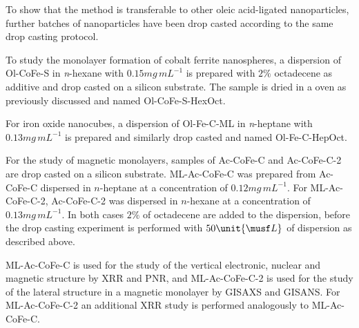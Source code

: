 \documentclass[\main/dresen_thesis.tex]{subfiles}
\begin{document}
      To show that the method is transferable to other oleic acid-ligated nanoparticles, further batches of nanoparticles have been drop casted according to the same drop casting protocol.

      To study the monolayer formation of cobalt ferrite nanospheres, a dispersion of Ol-CoFe-S in \textit{n}-hexane with $0.15 \unit{mg \, mL^{-1}}$ is prepared with $2 \unit{\%}$ octadecene as additive and drop casted on a silicon substrate.
      The sample is dried in a oven as previously discussed and named Ol-CoFe-S-HexOct.

      For iron oxide nanocubes, a dispersion of Ol-Fe-C-ML in \textit{n}-heptane with $0.13 \unit{mg \, mL^{-1}}$ is prepared and similarly drop casted and named Ol-Fe-C-HepOct.

      For the study of magnetic monolayers, samples of Ac-CoFe-C and Ac-CoFe-C-2 are drop casted on a silicon substrate.
      ML-Ac-CoFe-C was prepared from Ac-CoFe-C dispersed in $\mathit{n}$-heptane at a concentration of $0.12 \unit{mg \, mL^{-1}}$.
      For ML-Ac-CoFe-C-2, Ac-CoFe-C-2 was dispersed in $\mathit{n}$-hexane at a concentration of $0.13 \unit{mg \, mL^{-1}}$.
      In both cases $2 \unit{\%}$ of octadecene are added to the dispersion, before the drop casting experiment is performed with $50 \unit{\musf L}$ of dispersion as described above.

      ML-Ac-CoFe-C is used for the study of the vertical electronic, nuclear and magnetic structure by XRR and PNR, and ML-Ac-CoFe-C-2 is used for the study of the lateral structure in a magnetic monolayer by GISAXS and GISANS.
      For ML-Ac-CoFe-C-2 an additional XRR study is performed analogously to ML-Ac-CoFe-C.
\end{document}
